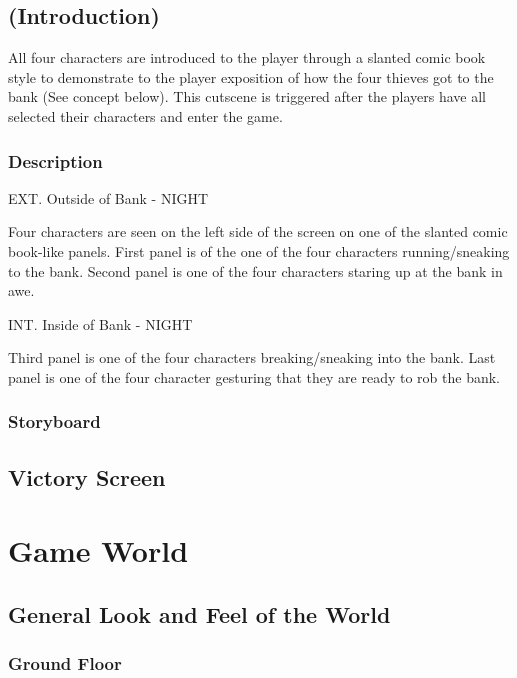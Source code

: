 \documentclass[14pt]{report}
\begin{document}
\subsection{(Introduction)}

All four characters are introduced to the player through a slanted comic book style to demonstrate to the player exposition of how the four thieves got to the bank (See concept below). This cutscene is triggered after the players have all selected their characters and enter the game.

\subsubsection{Description}

EXT. Outside of Bank - NIGHT

Four characters are seen on the left side of the screen on one of the slanted comic book-like panels. 
First panel is of the one of the four characters running/sneaking to the bank.
Second panel is one of the four characters staring up at the bank in awe.
	
INT. Inside of Bank - NIGHT

Third panel is one of the four characters breaking/sneaking into the bank.
Last panel is one of the four character gesturing that they are ready to rob the bank.

\subsubsection{Storyboard}

\subsection{Victory Screen}

\section{Game World}

\subsection{General Look and Feel of the World}

\subsubsection{Ground Floor}
\end{document}

